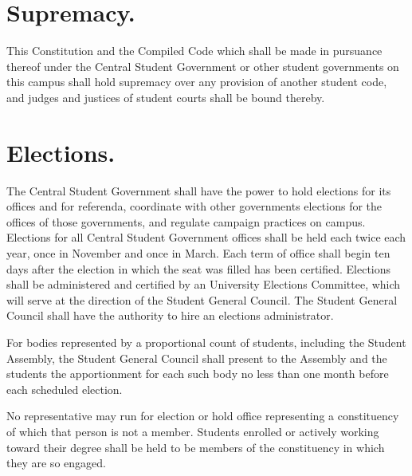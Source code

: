\section{Supremacy.}
    This Constitution and the Compiled Code which shall be made in pursuance thereof under the Central Student Government or other student governments on this campus shall hold supremacy over any provision of another student code, and judges and justices of student courts shall be bound thereby.

\section{Elections.}
    The Central Student Government shall have the power to hold elections for its offices and for referenda, coordinate with other governments elections for the offices of those governments, and regulate campaign practices on campus. Elections for all Central Student Government offices shall be held each twice each year, once in November and once in March. Each term of office shall begin ten days after the election in which the seat was filled has been certified. Elections shall be administered and certified by an University Elections Committee, which will serve at the direction of the Student General Council. The Student General Council shall have the authority to hire an elections administrator.

    For bodies represented by a proportional count of students, including the Student Assembly, the Student General Council shall present to the Assembly and the students the apportionment for each such body no less than one month before each scheduled election.

    No representative may run for election or hold office representing a constituency of which that person is not a member. Students enrolled or actively working toward their degree shall be held to be members of the constituency in which they are so engaged.